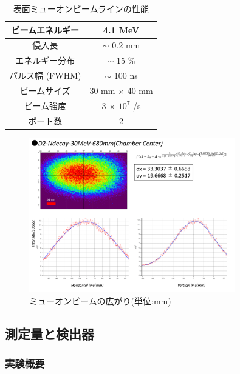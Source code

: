   

      
  \begin{table}[H]
    \caption{表面ミューオンビームラインの性能}
    \label{muon1}
    \centering
    \begin{tabular}{|c|c|}\hline
      ビームエネルギー & 4.1 MeV \\ \hline
      侵入長 & $\sim$ 0.2 mm \\ \hline
      エネルギー分布 & $\sim$ 15  \% \\ \hline
      パルス幅 (FWHM) & $\sim$ 100 ns \\ \hline
      ビームサイズ & 30 mm $\times$ 40 mm \\ \hline
      ビーム強度 & 3 $\times$ $10^7$ /s \\ \hline
      ポート数 & 2 \\ \hline
    \end{tabular}
  \end{table}
   
  \begin{figure}[H]
    \centering
    \includegraphics[width=0.8\textwidth]{figure/hayakawa/profile.pdf}
    \caption{ミューオンビームの広がり(単位:$\mathrm{mm}$)}
    \label{muon2}
  \end{figure}
  
  \subsection{測定量と検出器}
  \subsubsection{実験概要}

